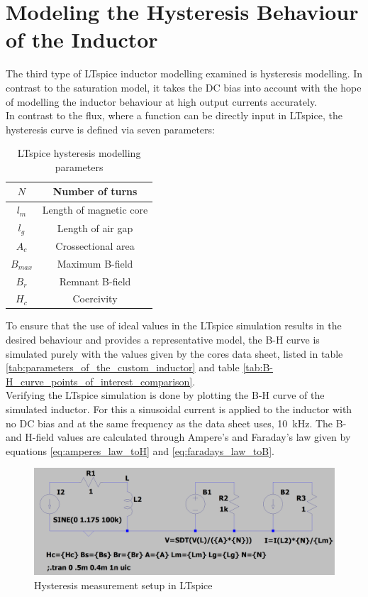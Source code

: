 \section{Modeling the Hysteresis Behaviour of the Inductor}\label{modeling_the_hysteresis_behaviour_of_the_inductor}
The third type of LTspice inductor modelling examined is hysteresis modelling. In contrast to the saturation model, it takes the \ac{DC} bias into account with the hope of modelling the inductor behaviour at high output currents accurately.\\
In contrast to the flux, where a function can be directly input in LTspice, the hysteresis curve is defined via seven parameters: 
\begin{table}[H]
    \centering
    \caption{LTspice hysteresis modelling parameters}
    \begin{tabular}{|c|c|}
        \hline
        $N$ & Number of turns\\
        \hline
        $l_m$ & Length of magnetic core\\
        \hline
        $l_g$ & Length of air gap\\
        \hline
        $A_c$ & Crossectional area \\
        \hline
        $B_{max}$ & Maximum B-field\\
        \hline
        $B_r$ & Remnant B-field\\
        \hline
        $H_c$ & Coercivity\\
        \hline
    \end{tabular}
    \label{tab:ltspice_hystersis_modling_parameters}
\end{table}
To ensure that the use of ideal values in the LTspice simulation results in the desired behaviour and provides a representative model, the B-H curve is simulated purely with the values given by the cores data sheet, listed in table \ref{tab:parameters_of_the_custom_inductor} and table \ref{tab:B-H_curve_points_of_interest_comparison}. \\
Verifying the LTspice simulation is done by plotting the B-H curve of the simulated inductor. For this a sinusoidal current is applied to the inductor with no \ac{DC} bias and at the same frequency as the data sheet uses, \SI{10}{\kilo\Hz}. The B- and H-field values are calculated through Ampere's and Faraday's law given by equations \ref{eq:amperes_law_toH} and \ref{eq:faradays_law_toB}. \\
\begin{figure}[h]
    \centering
    \includegraphics[width=.9\linewidth]{Bilder//Kapitel3/Hysteresis_Measurement_Setup_LTspice.png}
    \caption{Hysteresis measurement setup in LTspice}
    \label{fig:hysteresis_measurement_setup_in_LTspice}
\end{figure}

